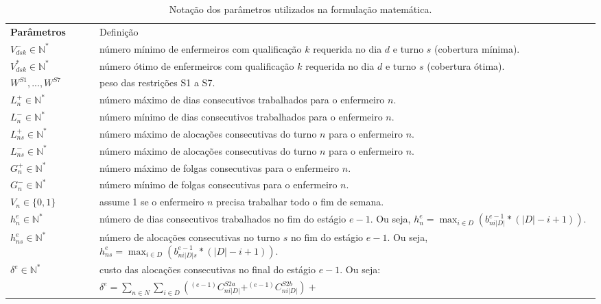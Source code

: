 \documentclass[cic,tc, twoside]{iiufrgs}
\begin{document}
\newpage
\begin{table}[H]
\centering
\caption{Notação dos parâmetros utilizados na formulação matemática.}
\small
\begin{tabularx}{\linewidth}{l@{}X}
\hline\noalign{\smallskip}
\textbf{Parâmetros}{~~~~~}  & Definição  \\
\noalign{\smallskip}\hline\noalign{\smallskip}
 $V^-_{dsk} \in \mathbb{N^*}$   & número mínimo de enfermeiros com qualificação $k$ requerida no dia $d$ e turno $s$ (cobertura mínima).  \\
 $V^*_{dsk} \in \mathbb{N^*}$   & número ótimo de enfermeiros com qualificação $k$ requerida no dia $d$ e turno $s$ (cobertura ótima).  \\
 $W^{S1}, ..., W^{S7}$ & peso das restrições S1 a S7.\\
$L^+_{n} \in \mathbb{N^*}$   & número máximo de dias consecutivos trabalhados para o enfermeiro $n$.\\
$L^-_{n} \in \mathbb{N^*}$   & número mínimo de dias consecutivos trabalhados para o enfermeiro $n$.\\
$L^+_{ns} \in \mathbb{N^*}$   & número máximo de alocações consecutivas do turno $n$ para o enfermeiro $n$.\\
$L^-_{ns} \in \mathbb{N^*}$   & número máximo de alocações consecutivas do turno $n$ para o enfermeiro $n$.\\
$G^+_{n} \in \mathbb{N^*}$   & número máximo de folgas consecutivas para o enfermeiro $n$.\\
$G^-_{n} \in \mathbb{N^*}$   & número mínimo de folgas consecutivas para o enfermeiro $n$.\\
$V_{n} \in \{0,1\}$   & assume 1 se o enfermeiro $n$ precisa trabalhar todo o fim de semana.\\
$h^{e}_{n} \in \mathbb{N^*}$ & número de dias consecutivos trabalhados no fim do estágio $e-1$. Ou seja, $h^{e}_{n} = \max_{i \in D} \left(b^{e-1}_{ni|D|} * (|D|-i+1)\right).$\\
$h^{e}_{ns} \in \mathbb{N^*}$ & número de alocações consecutivas no turno $s$ no fim do estágio $e-1$. Ou seja, $h^{e}_{ns} = \max_{i \in D} \left(b^{e-1}_{ni|D|s} * (|D|-i+1)\right).$\\
$\delta^{e} \in \mathbb{N^*}$ & custo das alocações consecutivas no final do estágio $e-1$.  Ou seja: \\
						& $\delta^{e} = \sum_{n \in N} \sum_{i \in D} \left(^{(e-1)}C^{S2a}_{ni|D|} + ^{(e-1)}C^{S2b}_{ni|D|}\right) + $\\ 

\end{tabularx}
\end{table}
\end{document}
